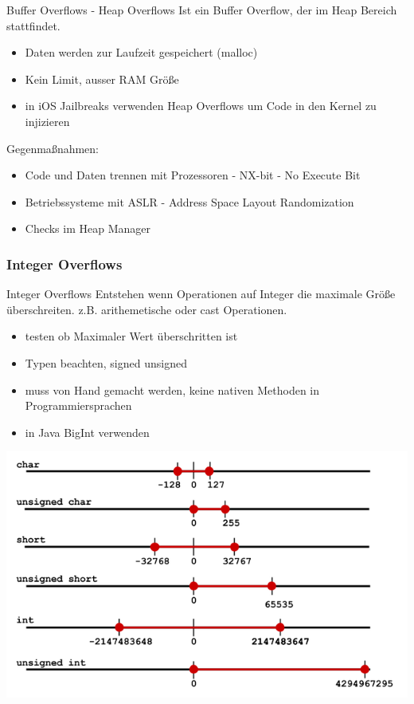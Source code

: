 \documentclass[10pt]{beamer}
\begin{document}
\begin{frame}[fragile]{Buffer Overflows - Heap Overflows}
  Ist ein Buffer Overflow, der im Heap Bereich stattfindet.
  \begin{itemize}
    \item Daten werden zur Laufzeit gespeichert (malloc)
    \item Kein Limit, ausser RAM Gr\"o{\ss}e
    \item in iOS Jailbreaks verwenden Heap Overflows um Code in den Kernel zu injizieren
  \end{itemize}
  Gegenma{\ss}nahmen:
  \begin{itemize}
    \item Code und Daten trennen mit Prozessoren - NX-bit - No Execute Bit
    \item Betriebssysteme mit ASLR - Address Space Layout Randomization
    \item Checks im Heap Manager
  \end{itemize}
\end{frame}

\subsubsection{Integer Overflows}

\begin{frame}[fragile]{Integer Overflows}
  Entstehen wenn Operationen auf Integer die maximale Gr\"o{\ss}e \"uberschreiten. z.B. arithemetische oder cast Operationen.
  \begin{itemize}
    \item testen ob Maximaler Wert \"uberschritten ist
    \item Typen beachten, signed unsigned
    \item muss von Hand gemacht werden, keine nativen Methoden in Programmiersprachen
    \item in Java BigInt verwenden
  \end{itemize}
  \includegraphics[scale=0.25]{integer_overflow}
\end{frame}
\end{document}
